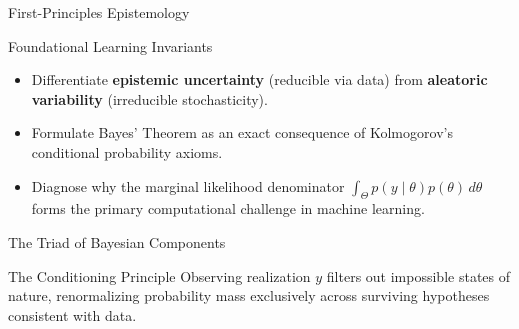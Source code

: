 
\begin{frame}{First-Principles Epistemology}
  \begin{LearningGoals}{Foundational Learning Invariants}
    \begin{itemize}\setlength{\itemsep}{.35em}
      \item Differentiate \textbf{epistemic uncertainty} (reducible via data) from \textbf{aleatoric variability} (irreducible stochasticity).
      \item Formulate Bayes' Theorem as an exact consequence of Kolmogorov's conditional probability axioms.
      \item Diagnose why the marginal likelihood denominator \(\int_{\Theta} p(y \mid \theta) p(\theta) \, d\theta\) forms the primary computational challenge in machine learning.
    \end{itemize}
  \end{LearningGoals}
  \vspace{.15cm}
\end{frame}

\begin{frame}{The Triad of Bayesian Components}
  \vspace{.15cm}
  \begin{ConceptCard}[INVARIANT]{The Conditioning Principle}
    Observing realization \(y\) filters out impossible states of nature, renormalizing probability mass exclusively across surviving hypotheses consistent with data.
  \end{ConceptCard}
\end{frame}

